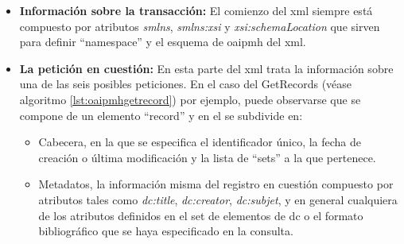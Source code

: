 \begin{itemize}
	\item \textbf{Información sobre la transacción:} El comienzo del \acrshort{xml} siempre está compuesto por atributos \textit{smlns}, \textit{smlns:xsi} y \textit{xsi:schemaLocation} que sirven para definir ``namespace'' y el esquema de \acrshort{oaipmh} del \acrshort{xml}.

	\item \textbf{La petición en cuestión:} En esta parte del \acrshort{xml} trata la información sobre una de las seis posibles peticiones. En el caso del GetRecords (véase algoritmo \ref{lst:oaipmhgetrecord}) por ejemplo, puede observarse que se compone de un elemento ``record'' y en el se subdivide en:
		\begin{itemize}
			\item Cabecera, en la que se especifica el identificador único, la fecha de creación o última modificación y la lista de ``sets'' a la que pertenece.
			\item Metadatos, la información misma del registro en cuestión compuesto por atributos tales como \textit{dc:title}, \textit{dc:creator}, \textit{dc:subjet}, y en general cualquiera de los atributos definidos en el set de elementos de \acrshort{dc}\cite{DCElements} o el formato bibliográfico que se haya especificado en la consulta.
		\end{itemize}
\end{itemize}